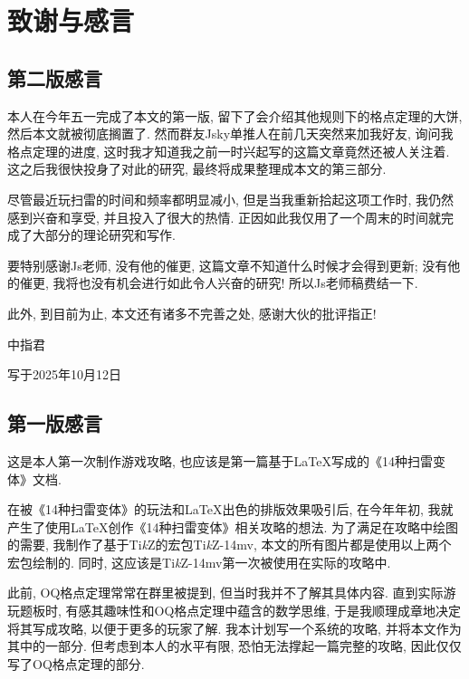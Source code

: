 \documentclass{ctexart}
\newcommand{\varible}[1]{{\Noto[#1]}}
\begin{document}
\pagebreak

\section{致谢与感言}
\subsection{第二版感言}
本人在今年五一完成了本文的第一版, 留下了会介绍其他规则下的格点定理的大饼, 然后本文就被彻底搁置了. 然而群友Jsky单推人在前几天突然来加我好友, 询问我格点定理的进度, 这时我才知道我之前一时兴起写的这篇文章竟然还被人关注着. 这之后我很快投身了对此的研究, 最终将成果整理成本文的第三部分.

尽管最近玩扫雷的时间和频率都明显减小, 但是当我重新拾起这项工作时, 我仍然感到兴奋和享受, 并且投入了很大的热情. 正因如此我仅用了一个周末的时间就完成了大部分的理论研究和写作.

要特别感谢Js老师, 没有他的催更, 这篇文章不知道什么时候才会得到更新; 没有他的催更, 我将也没有机会进行如此令人兴奋的研究! {\footnotesize \color[rgb]{.7,.7,.7} 所以Js老师稿费结一下.}

此外, 到目前为止, 本文还有诸多不完善之处, 感谢大伙的批评指正!

\begin{flushright}
    中指君

    写于2025年10月12日
\end{flushright}

\pagebreak

\subsection{第一版感言}

这是本人第一次制作游戏攻略, 也应该是第一篇基于\LaTeX 写成的《14种扫雷变体》文档. 

在被《14种扫雷变体》的玩法和\LaTeX 出色的排版效果吸引后, 在今年年初, 我就产生了使用\LaTeX 创作《14种扫雷变体》相关攻略的想法. 为了满足在攻略中绘图的需要, 我制作了基于Ti\emph{k}Z的宏包Ti\emph{k}Z-14mv, 本文的所有图片都是使用以上两个宏包绘制的. 同时, 这应该是Ti\emph{k}Z-14mv第一次被使用在实际的攻略中.

此前, OQ格点定理常常在群里被提到, 但当时我并不了解其具体内容. 直到实际游玩\varible{O}\varible{Q}题板时, 有感其趣味性和OQ格点定理中蕴含的数学思维, 于是我顺理成章地决定将其写成攻略, 以便于更多的玩家了解. 我本计划写一个系统的\varible{O}\varible{Q}攻略, 并将本文作为其中的一部分. 但考虑到本人的水平有限, 恐怕无法撑起一篇完整的攻略, 因此仅仅写了OQ格点定理的部分.
\end{document}
